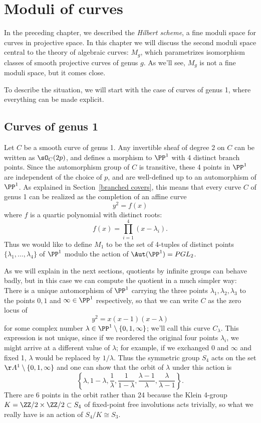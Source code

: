 


\chapter{Moduli of curves} 
\label{CurvesModuli chapter}\label{CurvesModuliChapter}


In the preceding chapter, we described the \emph{Hilbert scheme}, a fine moduli space for curves in projective space. In
this chapter we will discuss the second moduli space central to the theory of algebraic curves: $M_g$, which parametrizes isomorphism classes of smooth projective curves of genus $g$. As we'll see, $M_g$ is not a fine moduli space, but it comes close.

To describe the situation,  we will start with the case of curves of genus 1, where everything can be made explicit.


\section{Curves of genus 1}\label{Curves of genus 1}

Let $C$ be a smooth curve of genus 1. Any invertible sheaf of degree 2 on $C$ can be written as
$\sO_C(2p)$, and defines
a morphism to $\PP^1$ with 4 distinct branch points. Since the automorphism group of $C$ is transitive,
these 4 points in $\PP^1$ are independent of the choice of $p$, and are well-defined
up to an automorphism of $\PP^1$.    As explained in Section~\ref{branched covers},  this means that every curve $C$ of genus 1 can be realized as the completion of an affine curve
$$
y^2 = f(x)
$$
where $f$ is a quartic polynomial with distinct roots:
$$
f(x) = \prod_{i=1}^4 (x - \lambda_i).
$$
Thus we would like to define $M_1$ to be the set of 4-tuples of distinct points $\{\lambda_{1}, \dots, \lambda_{4}\}$ of $\PP^1$ modulo the action of $\Aut(\PP^1) = PGL_2$.

As we will explain in the next sections, quotients by infinite groups can behave badly,
but in this case we can compute the quotient in a much simpler way:
There is a unique automorphism of $\PP^1$ carrying the three points $\lambda_1, \lambda_2,\lambda_3$ to the points $0, 1$ and $\infty \in \PP^1$ respectively, so that we can write $C$ as the zero locus of
$$
y^2 = x(x-1)(x-\lambda)
$$
for some complex number $\lambda  \in \PP^1 \setminus \{0,1,\infty\}$; we'll call this curve $C_\lambda$. 
This expression is not unique, since if we reordered the original  four points $\lambda_i$, we might arrive at a different value of $\lambda$; for example, if we exchanged 0 and $\infty$ and fixed 1, $\lambda$ would be replaced by $1/\lambda$. Thus the symmetric group $S_4$ acts on the set $\AA^1 \setminus \{0,1,\infty\}$
and one can show that the orbit of $\lambda$ under this action is
$$
 \left\{ \lambda, 1-\lambda, \frac{1}{\lambda}, \frac{1}{1-\lambda}, \frac{\lambda-1}{\lambda}, \frac{\lambda}{\lambda - 1} \right\}.
$$
There are 6 points in the orbit rather than 24 because the Klein 4-group
$K = \ZZ/2\times \ZZ/2 \subset S_4$ of fixed-point free involutions acts trivially, so what we really have is an action of $S_4/K \cong S_3$.

